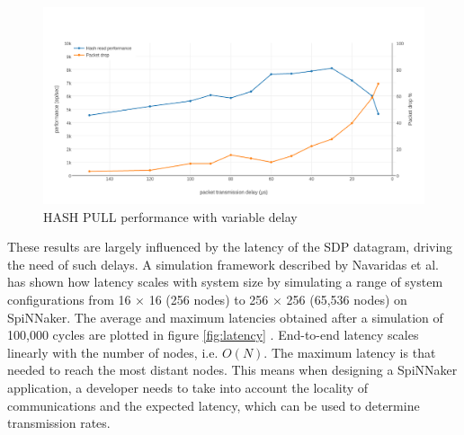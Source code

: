\begin{figure}
\begin{center}
	\includegraphics[width=1.3\textwidth, natwidth=1063, natheight=550]{images/hash_performance.png}
\end{center}
\caption{HASH PULL performance with variable delay}
\label{fig:hash-performance}
\end{figure}

These results are largely influenced by the latency of the SDP datagram, driving the need of such delays. A simulation framework described by Navaridas et al. \cite{impacttraffic} has shown how latency scales with system size by simulating a range of system configurations from 16 × 16 (256 nodes) to 256 × 256 (65,536 nodes) on SpiNNaker. The average and maximum latencies obtained after a simulation of 100,000 cycles are plotted in figure \ref{fig:latency} \cite{scalablecomm}. End-to-end latency scales linearly with the number of nodes, i.e. $O(N)$. The maximum latency is that needed to reach the most distant nodes. This means when designing a SpiNNaker application, a developer needs to take into account the locality of communications and the expected latency, which can be used to determine transmission rates.

